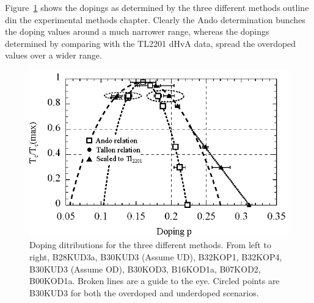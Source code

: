 Figure~\ref{Fig:ExpH:Dopings} shows the dopings as determined by the three different methods outline din the experimental methods chapter. Clearly the Ando determination bunches the doping values around a much narrower range, whereas the dopings determined by comparing with the \ac{TL2201} \ac{dHvA} data, spread the overdoped values over a wider range.

\begin{figure}[htbp]
    \begin{center}
        \includegraphics[scale=1.1]{Chapter-HallBSCO/Figures/Dopings/Dopings}
        \caption{Doping ditributions for the three different methods. From left to right, B28KUD3a, B30KUD3 (Assume UD), B32KOP1, B32KOP4, B30KUD3 (Assume OD), B30KOD3, B16KOD1a, B07KOD2, B00KOD1a. Broken lines are a guide to the eye. Circled points are B30KUD3 for both the overdoped and underdoped scenarios.}
        \label{Fig:ExpH:Dopings}
    \end{center}
\end{figure}

